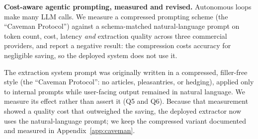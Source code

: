 %
%
%



    \item \textbf{Cost-aware agentic prompting, measured and revised.}
    Autonomous loops make many LLM calls. We measure a compressed prompting
    scheme (the ``Caveman Protocol'') against a schema-matched natural-language
    prompt on token count, cost, latency \emph{and} extraction quality across
    three commercial providers, and report a negative result: the compression
    costs accuracy for negligible saving, so the deployed system does not use it.



The extraction system prompt was originally written in a compressed, filler-free
style (the ``Caveman Protocol'': no articles, pleasantries, or hedging), applied
only to internal prompts while user-facing output remained in natural language.
We measure its effect rather than assert it (Q5 and Q6). Because that measurement
showed a quality cost that outweighed the saving, the deployed extractor now uses
the natural-language prompt; we keep the compressed variant documented and
measured in Appendix~\ref{app:caveman}.



